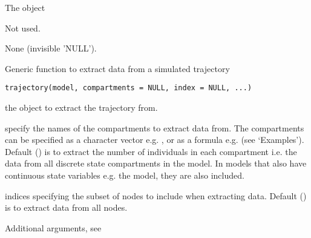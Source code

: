 \documentclass[letterpaper]{book}
\begin{document}
%
\begin{Arguments}
\begin{ldescription}
\item[\code{object}] The  object

\item[\code{...}] Not used.
\end{ldescription}
\end{Arguments}
%
\begin{Value}
None (invisible 'NULL').
\end{Value}
%
\begin{Description}
Generic function to extract data from a simulated trajectory
\end{Description}
%
\begin{Usage}
\begin{verbatim}
trajectory(model, compartments = NULL, index = NULL, ...)
\end{verbatim}
\end{Usage}
%
\begin{Arguments}
\begin{ldescription}
\item[\code{model}] the object to extract the trajectory from.

\item[\code{compartments}] specify the names of the compartments to
extract data from. The compartments can be specified as a
character vector e.g. ,
or as a formula e.g.  (see
`Examples'). Default () is to
extract the number of individuals in each compartment i.e. the
data from all discrete state compartments in the model. In
models that also have continuous state variables e.g. the
 model, they are also included.

\item[\code{index}] indices specifying the subset of nodes to include
when extracting data. Default () is to
extract data from all nodes.

\item[\code{...}] Additional arguments, see
\end{ldescription}
\end{Arguments}
\end{document}
